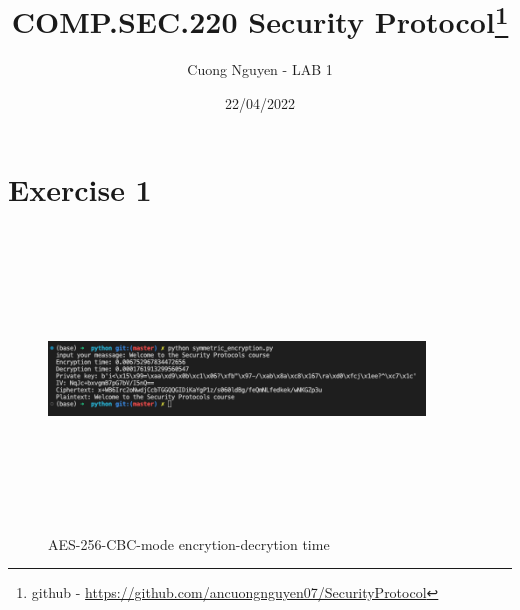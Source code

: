 \documentclass{article}
\title{COMP.SEC.220 Security Protocol\footnote{github - \url{https://github.com/ancuongnguyen07/SecurityProtocol}}}
\author{Cuong Nguyen - LAB 1}
\date{22/04/2022}
\begin{document}
    
\maketitle

\section*{Exercise 1}
%
\begin{figure}[hpt]
    \centering
    \includegraphics[width=100mm, height=80mm]{aes.png}
    \caption{AES-256-CBC-mode encrytion-decrytion time}
    \label{fig:aes-cbc}
\end{figure}

\end{document}
